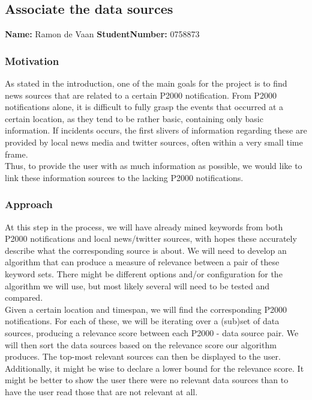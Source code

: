 \subsection{Associate the data sources}
\textbf{Name:} Ramon de Vaan \indent \textbf{StudentNumber:} 0758873

\subsubsection*{Motivation}
As stated in the introduction, one of the main goals for the project is to find news sources that are related to a certain P2000 notification.
From P2000 notifications alone, it is difficult to fully grasp the events that occurred at a certain location, as they tend to be rather basic, containing only basic information.
If incidents occurs, the first slivers of information regarding these are provided by local news media and twitter sources, often within a very small time frame. \\
Thus, to provide the user with as much information as possible, we would like to link these information sources to the lacking P2000 notifications.

\subsubsection*{Approach}
At this step in the process, we will have already mined keywords from both P2000 notifications and local news/twitter sources, with hopes these accurately describe what the corresponding source is about.
We will need to develop an algorithm that can produce a measure of relevance between a pair of these keyword sets.
There might be different options and/or configuration for the algorithm we will use, but most likely several will need to be tested and compared. \\

Given a certain location and timespan, we will find the corresponding P2000 notifications.
For each of these, we will be iterating over a (sub)set of data sources, producing a relevance score between each P2000 - data source pair.
We will then sort the data sources based on the relevance score our algorithm produces.
The top-most relevant sources can then be displayed to the user.
Additionally, it might be wise to declare a lower bound for the relevance score. 
It might be better to show the user there were no relevant data sources than to have the user read those that are not relevant at all. \\

